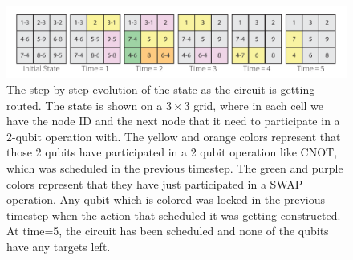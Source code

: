 \begin{figure}[ht]
    \centering
    \includegraphics[width=\linewidth]{figures/qroute/Evolution.pdf}
    \caption[qRoute evolution of state visualized]{\label{fig:supp-evolution}The step by step evolution of the state as the circuit is getting routed. The state is shown on a $3 \times 3$ grid, where in each cell we have the node ID and the next node that it need to participate in a 2-qubit operation with. The yellow and orange colors represent that those 2 qubits have participated in a 2 qubit operation like CNOT, which was scheduled in the previous timestep. The green and purple colors represent that they have just participated in a SWAP operation. Any qubit which is colored was locked in the previous timestep when the action that scheduled it was getting constructed. At time=5, the circuit has been scheduled and none of the qubits have any targets left.}
\end{figure}

